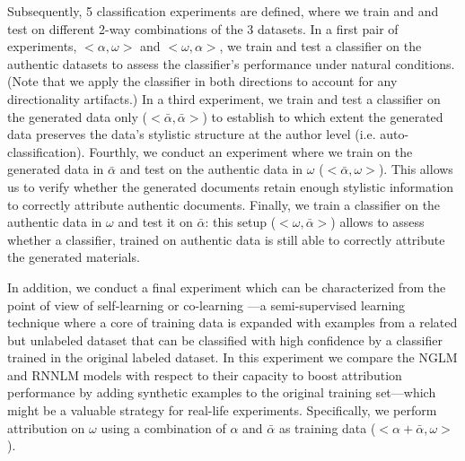 \documentclass[11pt]{article}
\begin{document}
Subsequently, 5 classification experiments are defined, where we train and and test on different 2-way 
combinations of the 3 datasets. In a first pair of experiments, $<\alpha,\omega>$ and $<\omega,\alpha>$, we
train and test a classifier on the authentic datasets to assess the classifier's performance under natural
conditions. (Note that we apply the classifier in both directions to account for any directionality artifacts.)
In a third experiment, we train and test a classifier on the generated data only ($<\bar{\alpha},\bar{\alpha}>$) to establish
to which extent the generated data preserves the data's stylistic structure at the author level 
(i.e. auto-classification). Fourthly, we conduct an experiment where we train on the generated data 
in $\bar{\alpha}$ and test on the authentic data in $\omega$ ($<\bar{\alpha},{\omega}>$). This allows 
us to verify whether the generated documents retain enough stylistic information to correctly attribute
authentic documents. Finally, we train a classifier on the authentic data in $\omega$ and test it on $\bar{\alpha}$: this setup ($<{\omega},\bar{\alpha}>$) allows to assess whether a classifier, trained on authentic data is still able to correctly attribute the generated materials. 

In addition, we conduct a final experiment which can be characterized from the point of view of self-learning or co-learning \cite{mihalcea2004co}---a semi-supervised learning technique where a core of training data is expanded with examples from a related but unlabeled dataset that can be classified with high confidence by a classifier trained in the original labeled dataset. In this experiment we compare the NGLM and RNNLM models with respect to their capacity to boost attribution performance by adding synthetic examples to the original training set---which might be a valuable strategy for real-life experiments. Specifically, we perform attribution on $\omega$ using a combination of $\alpha$ and $\bar{\alpha}$ as training data ($<\alpha+\bar{\alpha},\omega>$).

\end{document}
